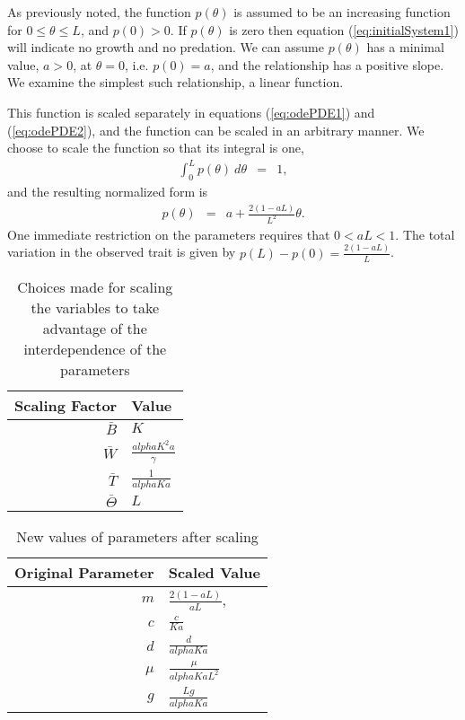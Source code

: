 \documentclass[review,authoryear]{elsarticle}
\def\alpha{alpha}%
\newcommand{\origAlpha}{{\alpha}}
\newcommand{\origK}{{K}}
\newcommand{\origGamma}{{\gamma}}
\newcommand{\origA}{{a}}
\newcommand{\origC}{{c}}
\newcommand{\origD}{{d}}
\newcommand{\origG}{{g}}
\newcommand{\origL}{{L}}
\newcommand{\origP}[1]{{p}(#1)}
\newcommand{\origTheta}{{\theta}}
\newcommand{\origMu}{{\mu}}
\begin{document}
As previously noted, the function $\origP{\origTheta}$ is assumed to be an
increasing function for $0\leq\origTheta\leq \origL$, and $\origP{0}>0$. If
$\origP{\origTheta}$ is zero then equation (\ref{eq:initialSystem1}) will
indicate no growth and no predation. We can assume $\origP{\origTheta}$ has a
minimal value, $a>0$,  at $\origTheta = 0$, i.e. $\origP{0}=a$, and the relationship has a positive slope. We
examine the simplest such relationship, a linear function.

This function is scaled separately in equations (\ref{eq:odePDE1}) and
(\ref{eq:odePDE2}), and the function can be scaled in an arbitrary
manner. We choose to scale the function so that its integral is one,
\begin{eqnarray*}
  \int^{\origL}_0 \origP{\origTheta} ~ d\origTheta & = & 1,
\end{eqnarray*}
and the resulting normalized form is
\begin{eqnarray}
  \label{eq:linearFormP}
  \origP{\origTheta} & = & \origA + \frac{2(1-\origA\origL)}{\origL^2} \origTheta.
\end{eqnarray}
One immediate restriction on the parameters requires that
$0<\origA\origL<1$. The total variation in the observed trait is given by 
$\origP{\origL} - \origP{0} =\frac{2(1-\origA\origL)}{\origL}$.

\begin{table}[ht]
  \centering
  \begin{tabular}{r|l}
    Scaling Factor & Value \\ \hline
    $\bar{B}$ & $\origK$ \\ [10pt]
    $\bar{W}$ & $\frac{\origAlpha \origK^2 \origA}{\origGamma}$ \\  [10pt]
    $\bar{T}$ & $\frac{1}{\origAlpha \origK \origA}$ \\  [10pt]
    $\bar{\Theta}$ & $\origL$
  \end{tabular}
  \caption{Choices made for scaling the variables to take advantage of the interdependence of the parameters}
  \label{tab:scalingChoices}
\end{table}

\begin{table}[ht]
  \centering
  \begin{tabular}{r|l}
  Original Parameter & Scaled Value \\ \hline
    $m$   & $\frac{2(1-\origA\origL)}{\origA\origL}$, \\  [10pt]
    $c$   & $\frac{\origC}{\origK\origA}$ \\  [10pt]
    $d$   & $\frac{\origD}{\origAlpha\origK\origA}$ \\  [10pt]
    $\mu$ & $\frac{\origMu}{\origAlpha\origK\origA\origL^2}$  \\  [10pt]
    $g$   & $\frac{\origL\origG}{\origAlpha\origK\origA}$
  \end{tabular}
  \caption{New values of parameters after scaling}
  \label{tab:newParameters}
\end{table}
\end{document}
